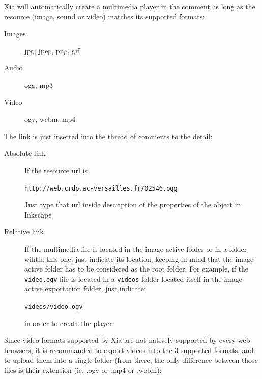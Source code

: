 Xia will automatically create a multimedia player in the comment as long as 
the resource (image, sound or video) matches its supported formats: 
\begin{description}
 \item [Images] jpg, jpeg, png, gif
 \item [Audio] ogg, mp3
 \item [Video] ogv, webm, mp4
\end{description}

The link is just inserted into the thread of comments to the detail:
\begin{description}
 \item[Absolute link] If the resource url is\\
 \begin{center}
 \verb|http://web.crdp.ac-versailles.fr/02546.ogg|\\
 \end{center}
 Just type that url inside description of the properties of the object in 
 Inkscape
 \item [Relative link] If the multimedia file is located in the image-active 
 folder or in a folder wihtin this one, just indicate its location, keeping in 
 mind that the image-active folder has to be considered as the root folder. 
 For example, if the \verb|video.ogv| file is located in a \verb|videos| 
 folder located itself in the image-active exportation folder, just indicate:\\
 \begin{center}
  \verb|videos/video.ogv|
 \end{center}
  in order to create the player
\end{description}

Since video formats supported by Xia are not natively supported by every web 
browsers, it is recommanded to export videos into the 3 supported formats, 
and to upload them into a single folder (from there, the only difference 
between those files is their extension (ie. .ogv or .mp4 or .webm):\\

